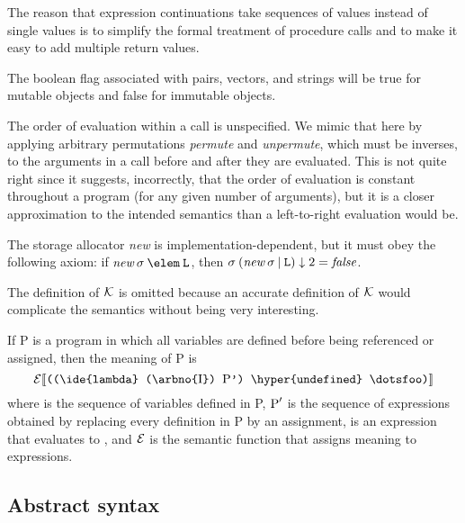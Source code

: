 The reason that expression continuations take sequences of values instead
of single values is to simplify the formal treatment of procedure calls
and to make it easy to add multiple return values.

The boolean flag associated with pairs, vectors, and strings will be true
for mutable objects and false for immutable objects.

The order of evaluation within a call is unspecified.  We mimic that
here by applying arbitrary permutations {\it permute} and {\it
unpermute}, which must be inverses, to the arguments in a call before
and after they are evaluated.  This is not quite right since it suggests,
incorrectly, that the order of evaluation is constant throughout a program (for
any given number of arguments), but it is a closer approximation to the intended
semantics than a left-to-right evaluation would be.

The storage allocator {\it new} is implementation-dependent, but it must
obey the following axiom:  if \hbox{$\fun{new}\:\sigma\:\elem\:\LOC$}, then
$\sigma\:(\fun{new}\:\sigma\:\vert\:\LOC)\elt 2 = {\it false}$.

\def\P{\hbox{\rm P}}
\def\I{\hbox{\rm I}}
\def\Ksem{\hbox{$\cal K$}}
\def\Esem{\hbox{$\cal E$}}

The definition of $\Ksem$ is omitted because an accurate definition of
$\Ksem$ would complicate the semantics without being very interesting.

If \P{} is a program in which all variables are defined before being
referenced or assigned, then the meaning of \P{} is
$$\Esem\sembrack{\hbox{\tt((\ide{lambda} (\arbno{\I}) \P')
\hyper{undefined} \dotsfoo)}}$$
where \arbno{\I} is the sequence of variables defined in \P, $\P'$
is the sequence of expressions obtained by replacing every definition
in \P{} by an assignment,  is an expression that evaluates
to , and
$\Esem$ is the semantic function that assigns meaning to expressions.



\subsection{Abstract syntax}

\def\K{\hbox{\rm K}}
\def\I{\hbox{\rm I}}
\def\E{\hbox{\rm E}}
\def\C{\hbox{$\Gamma$}}
\def\Con{\hbox{\rm Con}}
\def\Ide{\hbox{\rm Ide}}
\def\Exp{\hbox{\rm Exp}}
\def\Com{\hbox{\rm Com}}
\def\|{$\vert$}

